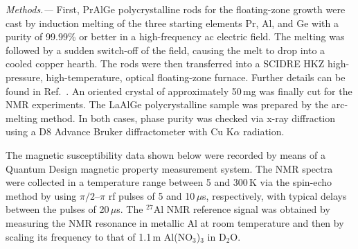 \documentclass[aps,prb,a4paper,10pt,twocolumn,showpacs,floatfix,superscriptaddress,preprintnumbers,longbibliography]{revtex4-2}
\begin{document}
%
\emph{Methods.---} First, PrAlGe polycrystalline rods for the
floating-zone growth were cast by induction melting of the three
starting elements Pr, Al, and Ge with a purity of 99.99\% or better in a
high-frequency ac electric field. %
The melting was followed by a sudden switch-off of the field, causing 
the melt to drop into a cooled copper hearth. The rods were then 
transferred into a SCIDRE HKZ high-pressure, high-temperature, optical 
floating-zone furnace. Further details can be found in
Ref.~\cite{puphal2019bulk}.
An oriented crystal of approximately 50\,mg was finally cut for the
NMR experiments.
The LaAlGe polycrystalline sample was prepared by the arc-melting method.
In both cases, phase purity was checked via x-ray diffraction using a
D8 Advance Bruker diffractometer with Cu K$\alpha$ radiation.

The magnetic susceptibility data shown below were re\-cord\-ed by means 
of a Quantum Design magnetic property mea\-sure\-ment system. %
%
The NMR spectra were collected in a temperature range between 5 and 300\,K 
via the spin-echo method by using $\pi/2$--$\pi$ rf pulses of 5 and 
10\,$\mu$s, respectively, with typical delays between the pulses of 
20\,$\mu$s. %
The $^{27}$Al NMR reference signal was obtained by measuring the NMR 
resonance in metallic Al at room temperature and then by scaling its 
frequency to that of 1.1\,m Al(NO$_{3}$)$_{3}$ in D$_{2}$O.
%
\end{document}
